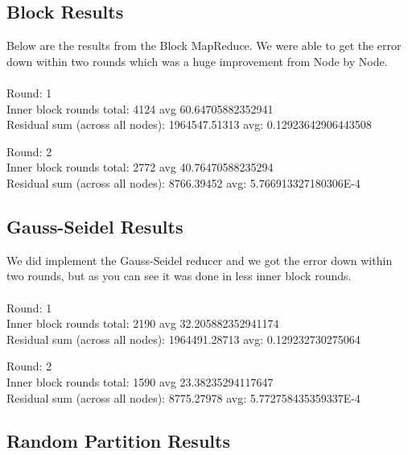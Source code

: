 \documentclass[11pt,letterpaper]{article}
\begin{document}
\subsection{Block Results}
Below are the results from the Block MapReduce. We were able to get the error down within two rounds which was a huge improvement from Node by Node.\\ \\
Round: 1 \\
Inner block rounds total: 4124 avg 60.64705882352941 \\
Residual sum (across all nodes): 1964547.51313 avg: 0.12923642906443508

Round: 2 \\
Inner block rounds total: 2772 avg 40.76470588235294 \\
Residual sum (across all nodes): 8766.39452 avg: 5.766913327180306E-4
\\
\subsection{Gauss-Seidel Results}
We did implement the Gauss-Seidel reducer and we got the error down within two rounds, but as you can see it was done in less inner block rounds.\\ \\
Round: 1 \\
Inner block rounds total: 2190 avg 32.205882352941174\\
Residual sum (across all nodes): 1964491.28713 avg: 0.129232730275064

Round: 2 \\
Inner block rounds total: 1590 avg 23.38235294117647\\
Residual sum (across all nodes): 8775.27978 avg: 5.772758435359337E-4
\\
\subsection{Random Partition Results}
\\
\end{document}
